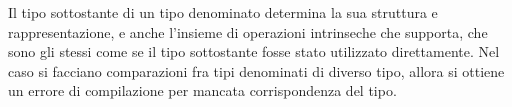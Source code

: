 \documentclass[../../thesis.tex]{subfiles}
\begin{document}
    Il tipo sottostante di un tipo denominato determina la sua struttura e rappresentazione, e anche l'insieme di operazioni intrinseche che supporta, che sono gli stessi come se il tipo sottostante fosse stato utilizzato direttamente.
    Nel caso si facciano comparazioni fra tipi denominati di diverso tipo, allora si ottiene un errore di compilazione per mancata corrispondenza del tipo.
    
\end{document}
